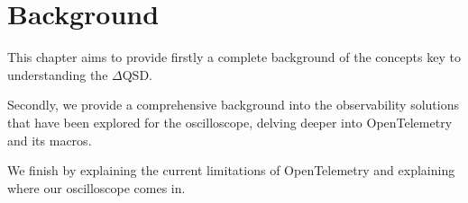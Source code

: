 \chapter{Background}
    This chapter aims to provide firstly a complete background of the concepts key to understanding the $\Delta$QSD.

    Secondly, we provide a comprehensive background into the observability solutions that have been explored for the oscilloscope, delving deeper into OpenTelemetry and its macros.
    
    We finish by explaining the current limitations of OpenTelemetry and explaining where our oscilloscope comes in.
    
    
    
    
